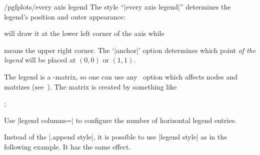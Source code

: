 {%
%
\begin{stylekey}{/pgfplots/every axis legend}
The style ``|every axis legend|'' determines the legend's position and outer appearance:
\begin{codeexample}
\end{codeexample}
will draw it at the lower left corner of the axis while
\begin{codeexample}
\end{codeexample}
means the upper right corner. The `|anchor|' option determines which point \emph{of the legend} will be placed at $(0,0)$ or $(1,1)$.

The legend is a \Tikz-matrix, so one can use any \Tikz\ option which affects
nodes and matrizes (see~\cite[section 13~and~14]{tikz}). The matrix is created by something like
\begin{codeexample}
;
\end{codeexample}

\begin{codeexample}[]
\end{codeexample}

Use |legend columns=| to configure the number of horizontal legend entries.
\begin{codeexample}[]
\end{codeexample}
\noindent
Instead of the |.append style|, it is possible to use |legend style| as in the following example. It has the same effect.


\end{stylekey}}
